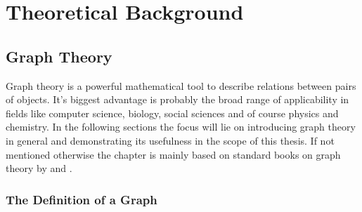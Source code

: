 
\part{Theoretical Background}
\label{sec:theory}

\chapter{Graph Theory}
\label{sec:graphtheory}

Graph theory is a powerful mathematical tool to describe relations between pairs
of objects. It's biggest advantage is probably the broad range of applicability
in fields like computer science, biology, social sciences and of course physics
and chemistry. In the following sections the focus will lie on introducing graph
theory in general and demonstrating its usefulness in the scope of this thesis.
If not mentioned otherwise the chapter is mainly based on standard books on
graph theory by
\citeauthor{West_Introductiongraphtheory_2001}\autocite{West_Introductiongraphtheory_2001}
and
\citeauthor{Balakrishnan_Schaumoutlinetheory_1997}\autocite{Balakrishnan_Schaumoutlinetheory_1997}.

\section{The Definition of a Graph}
\label{sec:DefinitionGraph}


